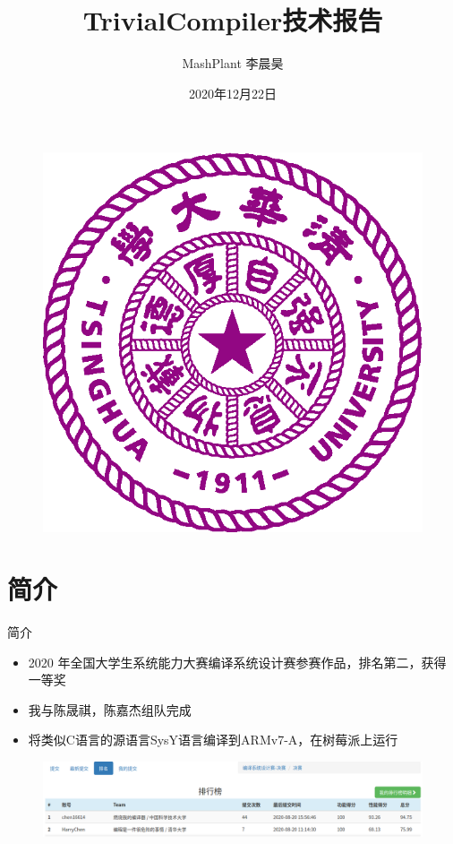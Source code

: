 \documentclass{beamer}
\author{MashPlant 李晨昊}
\title{TrivialCompiler技术报告}
\date{2020年12月22日}
\begin{document}
\kaishu
\begin{frame}
    \titlepage
    \begin{figure}[htpb]
        \begin{center}
            \includegraphics[width=0.2\linewidth]{pic/Tsinghua_University_Logo.eps}
        \end{center}
    \end{figure}
\end{frame}

\begin{frame}
    \tableofcontents[sectionstyle=show,subsectionstyle=show/shaded/hide,subsubsectionstyle=show/shaded/hide]
\end{frame}


\section{简介}

\begin{frame}{简介}
    \begin{itemize}
        \item 2020 年全国大学生系统能力大赛编译系统设计赛参赛作品，排名第二，获得一等奖
        \item 我与陈晟祺，陈嘉杰组队完成
        \item 将类似C语言的源语言SysY语言编译到ARMv7-A，在树莓派上运行
    \end{itemize}
  \begin{figure}[htpb]
    \centering
    \includegraphics[width=1.0\linewidth]{pic/rank.png}
  \end{figure}
\end{frame}
\end{document}
